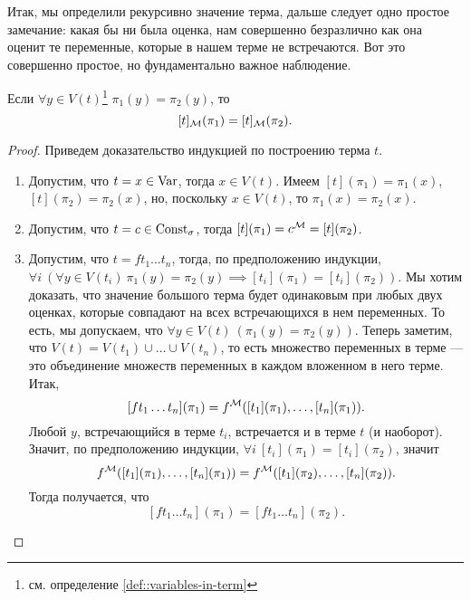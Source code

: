 Итак, мы определили рекурсивно значение терма, дальше следует одно простое замечание: какая бы ни была оценка, нам совершенно безразлично как она оценит те переменные, которые в нашем терме не встречаются.
Вот это совершенно простое, но фундаментально важное наблюдение.

\begin{lemma} \label{lem::evaluation-of-variables-in-term}
    Если $\forall y \in V(t)$\footnote{см. определение \ref{def::variables-in-term}} $\pi_{1}(y) = \pi_{2}(y)$, то
    $$
        [t]_{\mathcal{M}}(\pi_{1}) = [t]_{\mathcal{M}}(\pi_{2}).
    $$
\end{lemma}

\begin{proof}
    Приведем доказательство индукцией по построению терма $t$.
    \begin{enumerate}
        \item Допустим, что $t = x \in \mathrm{Var}$, тогда $x \in V(t)$.
        Имеем $[t](\pi_1) = \pi_{1}(x)$, $[t](\pi_{2}) = \pi_{2}(x)$, но, поскольку $x \in V(t)$, то $\pi_{1}(x) = \pi_{2}(x)$.
        \item Допустим, что $t = c \in \mathrm{Const}_{\sigma}$, тогда $[t](\pi_{1}) = c^{\mathcal{M}} = [t](\pi_{2})$.
        \item Допустим, что $t = f t_{1} \ldots t_{n}$, тогда, по предположению индукции, $\forall i~(\forall y \in V(t_{i})~\pi_{1}(y) = \pi_{2}(y) \implies [t_{i}](\pi_{1}) = [t_{i}](\pi_{2}))$.
        Мы хотим доказать, что значение большого терма будет одинаковым при любых двух оценках, которые совпадают на всех встречающихся в нем переменных.
        То есть, мы допускаем, что $\forall y \in V(t)~(\pi_{1}(y) = \pi_{2}(y))$.
        Теперь заметим, что $V(t) = V(t_{1}) \cup \ldots \cup V(t_{n})$, то есть множество переменных в терме --- это объединение множеств переменных в каждом вложенном в него терме.
        Итак,
        $$
            [f t_{1} \ldots t_{n}](\pi_{1}) = f^{\mathcal{M}}([t_{1}](\pi_{1}), \ldots, [t_{n}](\pi_{1})).
        $$
        Любой $y$, встречающийся в терме $t_{i}$, встречается и в терме $t$ (и наоборот).
        Значит, по предположению индукции, $\forall i~ [t_{i}](\pi_{1}) = [t_{i}](\pi_{2})$, значит
        $$
            f^{\mathcal{M}}([t_{1}](\pi_{1}), \ldots, [t_{n}](\pi_{1})) = f^{\mathcal{M}}([t_{1}](\pi_{2}), \ldots, [t_{n}](\pi_{2})).
        $$
        Тогда получается, что
        $$
            [f t_{1} \ldots t_{n}](\pi_{1}) = [f t_{1} \ldots t_{n}](\pi_{2}).
        $$ \qedhere
    \end{enumerate}
\end{proof}

